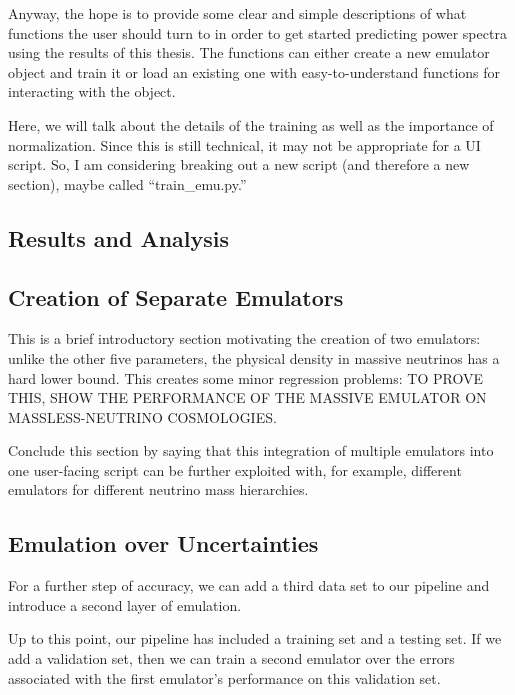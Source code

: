 \documentclass[11pt]{article}
\begin{document}
Anyway, the hope is to provide some clear and simple descriptions of what functions the user should turn to in order to get started predicting power spectra using the results of this thesis. The functions can either create a new emulator object and train it or load an existing one with easy-to-understand functions for interacting with the object.

Here, we will talk about the details of the training as well as the importance of normalization. Since this is still technical, it may not be appropriate for a UI script. So, I am considering breaking out a new script (and therefore a new section), maybe called ``train\_emu.py.''

\begin{centering}
\section{Results and Analysis}
\end{centering}

\begin{centering}
\subsection{Creation of Separate Emulators}
\end{centering}

This is a brief introductory section motivating the creation of two emulators: unlike the other five parameters, the physical density in massive neutrinos has a hard lower bound. This creates some minor regression problems: TO PROVE THIS, SHOW THE PERFORMANCE OF THE MASSIVE EMULATOR ON MASSLESS-NEUTRINO COSMOLOGIES.

Conclude this section by saying that this integration of multiple emulators into one user-facing script can be further exploited with, for example, different emulators for different neutrino mass hierarchies.

\begin{centering}
\subsection{Emulation over Uncertainties}
\end{centering}

For a further step of accuracy, we can add a third data set to our pipeline
and introduce a second layer of emulation.

Up to this point, our pipeline has included a training set and a testing set.
If we add a validation set, then we can train a second emulator over the
errors associated with the first emulator's performance on this validation
set.
\end{document}
